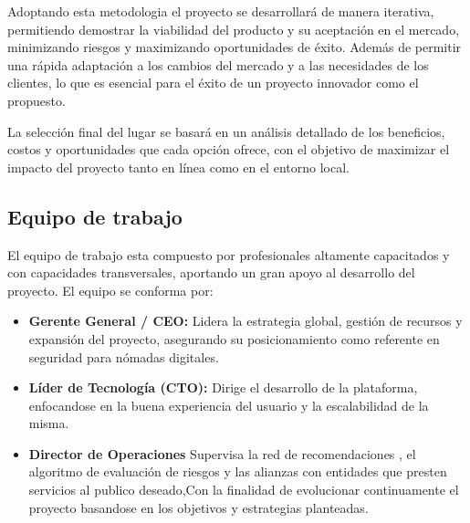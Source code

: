 Adoptando esta metodologia el proyecto se desarrollará de manera iterativa, permitiendo demostrar la viabilidad del producto y su aceptación en el mercado, minimizando riesgos y maximizando oportunidades de éxito. Además de permitir una rápida adaptación a los cambios del mercado y a las necesidades de los clientes, lo que es esencial para el éxito de un proyecto innovador como el propuesto.

La selección final del lugar se basará en un análisis detallado de los beneficios, costos y oportunidades que cada opción ofrece, con el objetivo de maximizar el impacto del proyecto tanto en línea como en el entorno local.

\subsection{Equipo de trabajo}
El equipo de trabajo esta compuesto por profesionales altamente capacitados y con capacidades transversales, aportando un gran apoyo al desarrollo del proyecto. El equipo se conforma por:
\begin{itemize}
    \item \textbf{Gerente General / CEO:} Lidera la estrategia global, gestión de recursos y expansión del proyecto, asegurando su posicionamiento como referente en seguridad para nómadas digitales.
    
    \item \textbf{Líder de Tecnología (CTO):} Dirige el desarrollo de la plataforma, enfocandose en la buena experiencia del usuario y la escalabilidad de la misma.
    
    \item \textbf{Director de Operaciones } Supervisa la red de recomendaciones , el algoritmo de evaluación de riesgos y las alianzas con entidades que presten servicios al publico deseado,Con la finalidad de evolucionar continuamente el proyecto basandose en los objetivos y estrategias planteadas.
\end{itemize}
